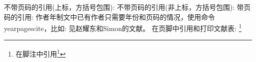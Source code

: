 \documentclass{article}%
\begin{document}

不带页码的引用(上标，方括号包围):
\cite{Peebles2001-100-100}
不带页码的引用(非上标，方括号包围):
\parencite{Miroslav2004--}
带页码的引用:
\cite[见][49页]{蔡敏2006--}  \parencite[见][49页]{Miroslav2004--}
  
作者年制文中已有作者只需要年份和页码的情况，使用命令yearpagescite，比如:
见赵耀东和Simon的文献。
在页脚中引用和打印文献表:
\footnote{在脚注中引用\footcite{赵学功2001--}}  


\printbibliography[heading=bibliography,title=参考文献]
\end{document}

